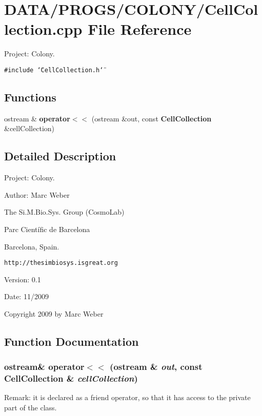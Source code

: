 \section{DATA/PROGS/COLONY/CellCollection.cpp File Reference}
\label{CellCollection_8cpp}
Project: Colony. 

{\tt \#include \char`\"{}CellCollection.h\char`\"{}}\par
\subsection*{Functions}
\begin{CompactItemize}
\item 
ostream \& {\bf operator$<$$<$} (ostream \&out, const {\bf CellCollection} \&cellCollection)
\end{CompactItemize}


\subsection{Detailed Description}
Project: Colony. 

\begin{Desc}
\item[Author:]Marc Weber\par
 The Si.M.Bio.Sys. Group (CosmoLab)\par
 Parc Científic de Barcelona\par
 Barcelona, Spain.\par
 {\tt http://thesimbiosys.isgreat.org} \end{Desc}
\begin{Desc}
\item[Version:]0.1 \end{Desc}
\begin{Desc}
\item[Date:]11/2009\end{Desc}
Copyright 2009 by Marc Weber 

\subsection{Function Documentation}
\subsubsection{\setlength{\rightskip}{0pt plus 5cm}ostream\& operator$<$$<$ (ostream \& {\em out}, \/  const {\bf CellCollection} \& {\em cellCollection})}\label{CellCollection_8cpp_b0a78cc0f31cec81458f40ab27bc7beb}


Remark: it is declared as a friend operator, so that it has access to the private part of the class. 